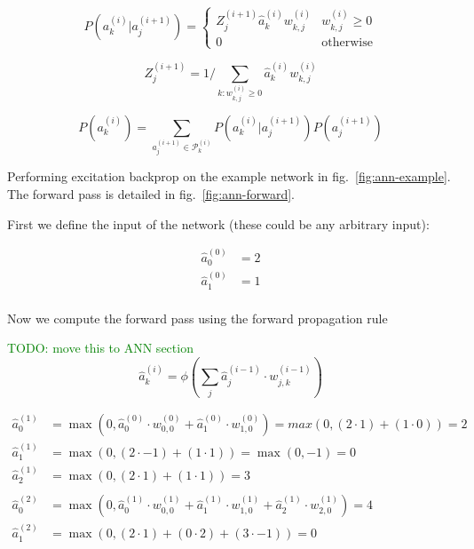 \documentclass[A4paper,draft]{scrreprt}
\newcommand{\neuron}[2]{a_{#2}^{(#1)}}
\newcommand{\neuronforward}[2]{\hat{a}_{#2}^{(#1)}}
\newcommand{\ebpscalar}[2]{Z_{#2}^{(#1)}}
\newcommand{\weight}[3]{w_{#2,#3}^{(#1)}}
\newcommand{\parents}[2]{\mathscr{P}^{(#1)}_{#2}}
\newcommand{\cwp}[4]{P\left(\neuron{#1}{#2} | \neuron{#3}{#4}\right)}
\newcommand{\mwp}[2]{P\left(\neuron{#1}{#2}\right)}
\begin{document}
\begin{equation}
\label{eq:ebp-cwp}
\cwp{i}{k}{i + 1}{j} = \begin{cases}
    \ebpscalar{i + 1}{j} \neuronforward{i}{k} \weight{i}{k}{j} & \weight{i}{k}{j} \geq 0 \\
    0 & \text{otherwise}
  \end{cases}
\end{equation}

\begin{equation}
\label{eq:ebp-cwp-scalar}
\ebpscalar{i + 1}{j} = 1 / \sum_{k:\weight{i}{k}{j} \geq 0} \neuronforward{i}{k} \weight{i}{k}{j}
\end{equation}

\begin{equation}
\label{eq:ebp-mwp}
\mwp{i}{k} = \sum_{\neuron{i+1}{j} \in \parents{i}{k}} \cwp{i}{k}{i + 1}{j} \mwp{i + 1}{j}
\end{equation}

Performing excitation backprop on the example network in
fig.~\ref{fig:ann-example}. The forward pass is detailed in
fig.~\ref{fig:ann-forward}.

First we define the input of the network (these could be any arbitrary
input):

\begin{align*}
\neuronforward{0}{0} &= 2\\
\neuronforward{0}{1} &= 1\\
\end{align*}

Now we compute the forward pass using the forward propagation rule

\textcolor{green}{TODO: move this to ANN section}\newline
\[\neuronforward{i}{k} = \phi(\sum_j \neuronforward{i - 1}{j} \cdot \weight{i - 1}{j}{k})\]

\begin{align*}
\neuronforward{1}{0} &= \max(0, \neuronforward{0}{0} \cdot \weight{0}{0}{0} +
    \neuronforward{0}{1} \cdot \weight{0}{1}{0})
  = max(0, (2 \cdot 1) + (1 \cdot 0)) = 2 \\
\neuronforward{1}{1} &= \max(0, (2 \cdot -1) + (1 \cdot 1)) = \max(0, -1) = 0\\
\neuronforward{1}{2} &= \max(0, (2 \cdot 1) + (1 \cdot 1)) = 3\\
\\
\neuronforward{2}{0} &= \max(0, \neuronforward{1}{0} \cdot \weight{1}{0}{0} +
    \neuronforward{1}{1} \cdot \weight{1}{1}{0} +
    \neuronforward{1}{2} \cdot \weight{1}{2}{0}) = 4 \\
\neuronforward{2}{1} &= \max(0, (2 \cdot 1) + (0 \cdot 2) + (3 \cdot -1)) = 0\\
\end{align*}
\end{document}
